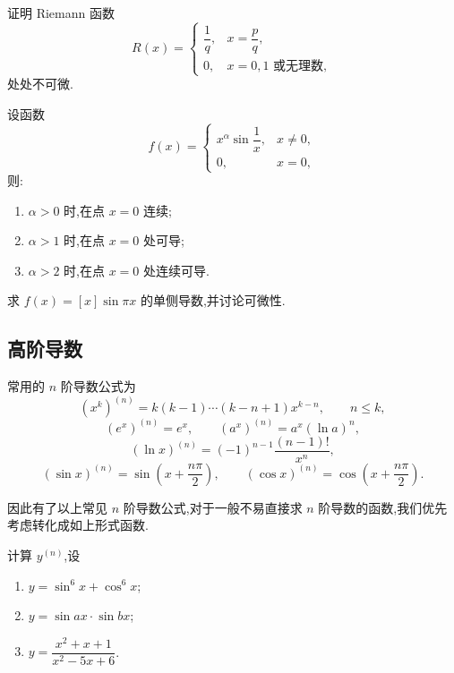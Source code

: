 \documentclass[../数学分析培优讲义.tex]{subfiles}
\begin{document}
\begin{example}[\markstar]
证明 Riemann 函数
\[
R(x)=
\begin{cases}
    \dfrac{1}{q}, & x=\dfrac{p}{q},\\
    0, & x=0,1\text{ 或无理数},
\end{cases}
\]
处处不可微.
\end{example}
\exampleblank

\begin{proposition}[\markstar]
设函数
\[
f(x)=
\begin{cases}
    x^\alpha\sin\dfrac{1}{x}, & x\neq0,\\
    0, & x=0,
\end{cases}
\]
则:
\begin{enumerate}[label=(\arabic*)]
    \item $\alpha>0$ 时,在点 $x=0$ 连续;
    \item $\alpha>1$ 时,在点 $x=0$ 处可导;
    \item $\alpha>2$ 时,在点 $x=0$ 处连续可导.
\end{enumerate}
\end{proposition}

\begin{example}
求 $f(x)=[x]\sin\pi x$ 的单侧导数,并讨论可微性.
\end{example}
\exampleblank


\newpage

\subsection{高阶导数}



\begin{theorem}[\markstar]
常用的 $n$ 阶导数公式为
\[
    (x^k)^{(n)}=k(k-1)\cdots(k-n+1)x^{k-n},
    \qquad n\leq k,
\]
\[
    (e^x)^{(n)}=e^x,
    \qquad
    (a^x)^{(n)}=a^x(\ln a)^n,
\]
\[
    (\ln x)^{(n)}=(-1)^{n-1}\dfrac{(n-1)!}{x^n},
\]
\[
    (\sin x)^{(n)}=\sin\left(x+\dfrac{n\pi}{2}\right),
    \qquad
    (\cos x)^{(n)}=\cos\left(x+\dfrac{n\pi}{2}\right).
\]
\end{theorem}

\begin{remark}
因此有了以上常见 $n$ 阶导数公式,对于一般不易直接求 $n$ 阶导数的函数,我们优先考虑转化成如上形式函数.
\end{remark}

\begin{example}
计算 $y^{(n)}$,设
\begin{enumerate}[label=(\arabic*)]
    \item $y=\sin^6x+\cos^6x$;
    \item $y=\sin ax\cdot\sin bx$;
    \item $y=\dfrac{x^2+x+1}{x^2-5x+6}$.
\end{enumerate}
\end{example}
\exampleblank
\end{document}
